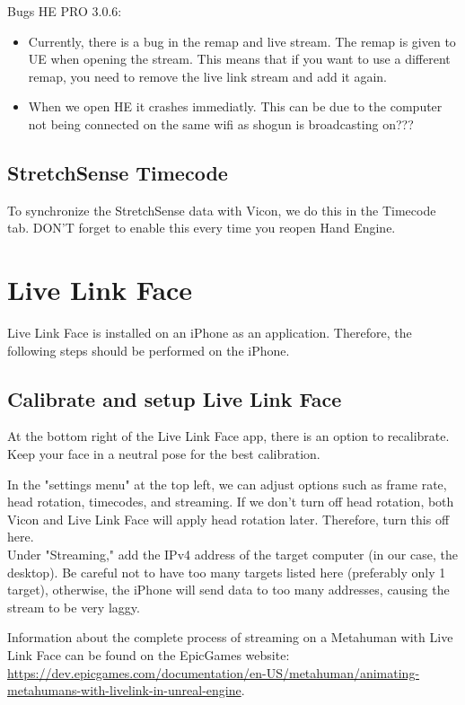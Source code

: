\documentclass{uva-inf-article}
\begin{document}
Bugs HE PRO 3.0.6:
\begin{itemize}
    \item Currently, there is a bug in the remap and live stream. The remap is given to UE when opening the stream. This means that if you want to use a different remap, you need to remove the live link stream and add it again.
    \item When we open HE it crashes immediatly. This can be due to the computer not being connected on the same wifi as shogun is broadcasting on??? 
\end{itemize}


\subsection{StretchSense Timecode}
To synchronize the StretchSense data with Vicon, we do this in the Timecode tab. DON'T forget to enable this every time you reopen Hand Engine.


\section{Live Link Face}
Live Link Face is installed on an iPhone as an application. Therefore, the following steps should be performed on the iPhone.

\subsection{Calibrate and setup Live Link Face}
At the bottom right of the Live Link Face app, there is an option to recalibrate. Keep your face in a neutral pose for the best calibration.

In the "settings menu" at the top left, we can adjust options such as frame rate, head rotation, timecodes, and streaming. If we don't turn off head rotation, both Vicon and Live Link Face will apply head rotation later. Therefore, turn this off here.\\
Under "Streaming," add the IPv4 address of the target computer (in our case, the desktop). Be careful not to have too many targets listed here (preferably only 1 target), otherwise, the iPhone will send data to too many addresses, causing the stream to be very laggy.

Information about the complete process of streaming on a Metahuman with Live Link Face can be found on the EpicGames website: \url{https://dev.epicgames.com/documentation/en-US/metahuman/animating-metahumans-with-livelink-in-unreal-engine}.
\end{document}
